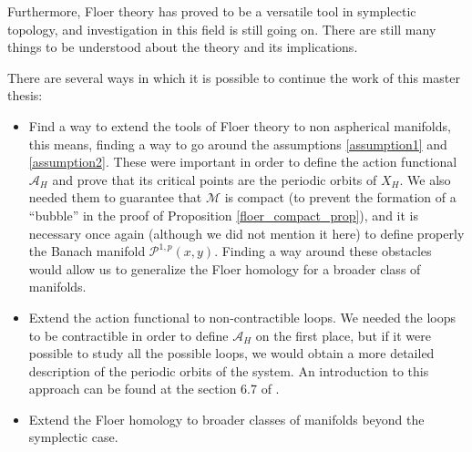 Furthermore, Floer theory has proved to be a versatile tool in symplectic topology, and investigation in this field is still going on. There are still many things to be understood about the theory and its implications.

There are several ways in which it is possible to continue the work of this master thesis:

\begin{itemize}
	\item Find a way to extend the tools of Floer theory to non aspherical manifolds, this means, finding a way to go around the assumptions \ref{assumption1} and \ref{assumption2}. These were important in order to define the action functional $\mathcal{A}_H$ and prove that its critical points are the periodic orbits of $X_H$. We also needed them to guarantee that $\mathcal{M}$ is compact (to prevent the formation of a “bubble” in the proof of Proposition \ref{floer_compact_prop}), and it is necessary once again (although we did not mention it here) to define properly the Banach manifold $\mathcal{P}^{1,p}(x,y)$. Finding a way around these obstacles would allow us to generalize the Floer homology for a broader class of manifolds.
	\item Extend the action functional to non-contractible loops. We needed the loops to be contractible in order to define $\mathcal{A}_H$ on the first place, but if it were possible to study all the possible loops, we would obtain a more detailed description of the periodic orbits of the system. An introduction to this approach can be found at the section 6.7 of \cite{audin2014morse}.
	\item Extend the Floer homology to broader classes of manifolds beyond the symplectic case.
\end{itemize}
